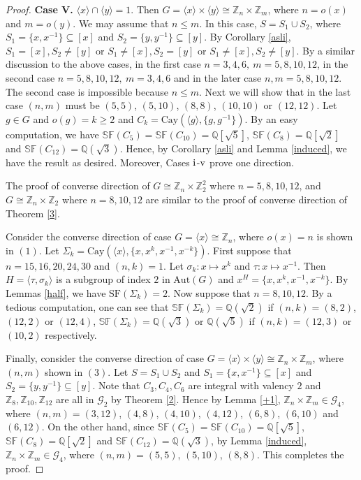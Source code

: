 \documentclass[12pt,a4paper]{article}
\def \leq {\leqslant}
\def \geq {\geqslant}
\begin{document}
\begin{proof}
		
		\textbf{Case V.} $\langle x\rangle\cap\langle y\rangle=1$. Then $G=\langle x\rangle\times\langle y\rangle\cong\mathbb Z_n\times\mathbb Z_m$, where $n=o(x)$ and $m=o(y)$. We may assume that $n\leq m$. In this case, $S=S_1\cup S_2$, where $S_1=\{x,x^{-1}\}\subseteq [x]$ and $S_2=\{y,y^{-1}\}\subseteq [y]$. By Corollary \ref{asli}, $S_1=[x], S_2\neq [y]$ or
		$S_1\neq [x],S_2=[y]$ or $S_1\neq [x],S_2\neq [y]$. By a similar discussion to the above cases, in the first case $n=3,4,6,~m=5,8,10,12$, in the second case $n=5,8,10,12,~m=3,4,6$ and in the later case $n,m=5,8,10,12$.
		The second case is impossible because $n\leq m$. 
		Next we will show that in the last case $(n,m)$ must be $(5,5)$, $(5,10)$, $(8,8)$, $(10,10)$ or $(12,12)$.	
		Let $g\in G$ and $o(g)=k\geq 2$ and $C_k=\mathrm{Cay}(\langle g\rangle,\{g,g^{-1}\})$.
		By an easy computation, we have $\mathbb{SF}(C_{5})=\mathbb{SF}(C_{10})=\mathbb Q[\sqrt{5}]$, $\mathbb{SF}(C_8)=\mathbb Q[\sqrt{2}]$ and $\mathbb{SF}(C_{12})=\mathbb Q(\sqrt{3})$. Hence, by Corollary \ref{asli} and Lemma \ref{induced}, we have the result as desired. Moreover, Cases $\mathrm{ \uppercase\expandafter{\romannumeral1}}$-$\mathrm{\uppercase\expandafter{\romannumeral5} }$ prove one direction.
		
		The proof of converse direction of $G\cong\mathbb Z_n\times\mathbb{Z}_2^2$ where $n=5,8,10,12$, and $G\cong\mathbb Z_n\times\mathbb{Z}_2$ where $n=8,10,12$ are similar to the proof of converse direction of Theorem \ref{3}.
		
		Consider the converse direction of case $G=\langle x\rangle \cong \mathbb Z_n$, where $o(x)=n$ is shown in $(1)$.
		Let $\Sigma_{k}=\mathrm{Cay}(\langle x\rangle,\{x,x^k,x^{-1},x^{-k}\})$. 
		First suppose that $n=15,16,20,24,30$ and $(n,k)=1$. 
		Let $\sigma_k:x\mapsto x^k$ and $\tau:x\mapsto x^{-1}$.
		Then $H=\langle \tau,\sigma_k\rangle$ is a subgroup of index $2$ in $\mathrm{Aut}(G)$ and $x^H=\{x,x^k,x^{-1},x^{-k}\}$.
		By Lemmas \ref{half}, we have $\mathrm{SF}(\Sigma_{k})=2$.
		Now suppose that $n=8,10,12$.
		By a tedious computation, one can see that $\mathbb{SF}(\Sigma_{k})=\mathbb Q(\sqrt{2})$ if $(n,k)=(8,2)$, $(12,2)$ or $(12,4)$,
		$\mathbb{SF}(\Sigma_{k})=\mathbb Q(\sqrt{3})$ or $\mathbb Q(\sqrt{5})$ if $(n,k)=(12,3)$ or $(10,2)$ respectively.	
		
		Finally, consider the converse direction of case $G=\langle x\rangle \times \langle y\rangle \cong \mathbb Z_n\times\mathbb Z_m$, where $(n,m)$ shown in $(3)$.
		Let $S=S_1\cup S_2$ and $S_1=\{x,x^{-1}\}\subseteq [x]$ and $S_2=\{y,y^{-1}\}\subseteq [y]$.
		Note that $C_3,C_4,C_6$ are integral with valency $2$ and $\mathbb{Z}_{8},\mathbb{Z}_{10},\mathbb{Z}_{12}$ are all in $\mathcal{G}_2$ by Theorem \ref{2}.
		Hence by Lemma \ref{+1}, $\mathbb Z_n\times\mathbb Z_m \in \mathcal{G}_4$, where $(n,m)=(3,12)$, $(4,8)$, $(4,10)$, $(4,12)$, $(6,8)$, $(6,10)$ and $(6,12)$.
		On the other hand, since $\mathbb{SF}(C_{5})=\mathbb{SF}(C_{10})=\mathbb Q[\sqrt{5}]$, $\mathbb{SF}(C_8)=\mathbb Q[\sqrt{2}]$ and $\mathbb{SF}(C_{12})=\mathbb Q(\sqrt{3})$, 
		by Lemma \ref{induced}, $\mathbb Z_n\times\mathbb Z_m \in \mathcal{G}_4$, where $(n,m)=(5,5)$, $(5,10)$, $(8,8)$. 
		This completes the proof.
	\end{proof}
\end{document}
